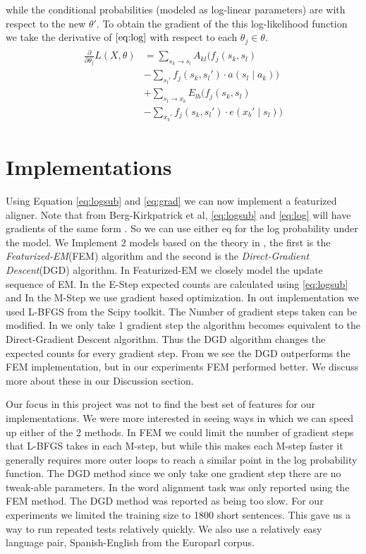 \documentclass[11pt,letterpaper]{article}
\begin{document}
while the conditional probabilities (modeled as log-linear parameters) are with
respect to the new $\theta'$. To obtain the gradient of the this log-likelihood
function we take the derivative of $\eqref{eq:log}$ with respect to each
$\theta_j \in \theta$.
\begin{align}
\begin{split}
\frac{\partial}{\partial\theta_j} L(X,\theta) &=  \sum_{s_k \rightarrow s_l} A_{kl}
(f_j(s_k, s_l) \\ &- \sum_{s_l'} f_j(s_k,s_l') \cdot a(s_l\mid a_k)) \\ & +
\sum_{s_l \rightarrow x_b} E_{lb}(f_j(s_k, s_l) \\ & - \sum_{x_b'} f_j(s_k,s_l')
\cdot e(x_b' \mid s_l)) \label{eq:grad}
\end{split}
\end{align}

\section{Implementations}
Using Equation \ref{eq:logsub} and \ref{eq:grad} we can now implement a featurized aligner. Note that from Berg-Kirkpatrick et al, \ref{eq:logsub} and \ref{eq:log} will have gradients of the same form \cite{berg2010painless}. So we can use either eq for the log probability under the model. We Implement 2 models based on the theory in \cite{berg2010painless}, the first is the \textit{Featurized-EM}(FEM) algorithm and the second is the \textit{Direct-Gradient Descent}(DGD) algorithm. In Featurized-EM we closely model the update sequence of EM. In the E-Step expected counts are calculated using \ref{eq:logsub} and In the M-Step we use gradient based optimization. In out implementation we used L-BFGS from the Scipy toolkit. The Number of gradient steps taken can be modified. In we only take 1 gradient step the algorithm becomes equivalent to the Direct-Gradient Descent algorithm. Thus the DGD algorithm changes the expected counts for every gradient step. From \cite{berg2010painless} we see the DGD outperforms the FEM implementation, but in our experiments FEM performed better. We discuss more about these in our Discussion section.

Our focus in this project was not to find the best set of features for our implementations. We were more interested in seeing ways in which we can speed up either of the 2 methods. In FEM we could limit the number of gradient steps that L-BFGS takes in each M-step, but while this makes each M-step faster it generally requires more outer loops to reach a similar point in the log probability function. The DGD method since we only take one gradient step there are no tweak-able parameters. In \cite{berg2010painless} the word alignment task was only reported using the FEM method. The DGD method was reported as being too slow. For our experiments we limited the training size to 1800 short sentences. This gave us a way to run repeated tests relatively quickly. We also use a relatively easy language pair, Spanish-English from the Europarl corpus. 
\end{document}
